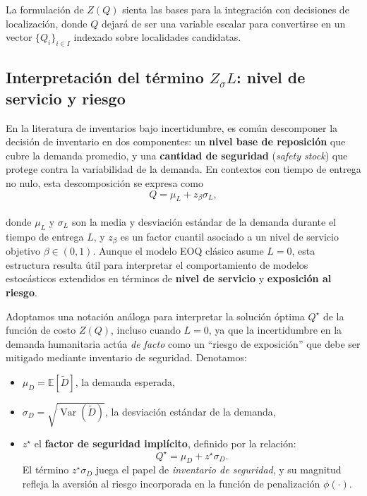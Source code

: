 \documentclass[
  spanish,
  us-letterpaper,
]{scrreprt}
\providecommand{\tightlist}{%
  \setlength{\itemsep}{0pt}\setlength{\parskip}{0pt}}
\numberwithin{equation}{section}
\begin{document}
La formulación de \(Z(Q)\) sienta las bases para la integración con
decisiones de localización, donde \(Q\) dejará de ser una variable
escalar para convertirse en un vector \(\{Q_i\}_{i \in I}\) indexado
sobre localidades candidatas.

\subsection{\texorpdfstring{Interpretación del término \(Z_{\sigma} L\):
nivel de servicio y
riesgo}{Interpretación del término Z\_\{\textbackslash sigma\} L: nivel de servicio y riesgo}}\label{interpretaciuxf3n-del-tuxe9rmino-z_sigma-l-nivel-de-servicio-y-riesgo}

En la literatura de inventarios bajo incertidumbre, es común descomponer
la decisión de inventario en dos componentes: un \textbf{nivel base de
reposición} que cubre la demanda promedio, y una \textbf{cantidad de
seguridad} (\emph{safety stock}) que protege contra la variabilidad de
la demanda. En contextos con tiempo de entrega no nulo, esta
descomposición se expresa como\\
\[
Q = \mu_L + z_\beta \sigma_L,
\]\\
donde \(\mu_L\) y \(\sigma_L\) son la media y desviación estándar de la
demanda durante el tiempo de entrega \(L\), y \(z_\beta\) es un factor
cuantil asociado a un nivel de servicio objetivo \(\beta \in (0,1)\).
Aunque el modelo EOQ clásico asume \(L = 0\), esta estructura resulta
útil para interpretar el comportamiento de modelos estocásticos
extendidos en términos de \textbf{nivel de servicio} y
\textbf{exposición al riesgo}.

Adoptamos una notación análoga para interpretar la solución óptima
\(Q^\star\) de la función de costo \(Z(Q)\), incluso cuando \(L = 0\),
ya que la incertidumbre en la demanda humanitaria actúa \emph{de facto}
como un ``riesgo de exposición'' que debe ser mitigado mediante
inventario de seguridad. Denotamos:

\begin{itemize}
\tightlist
\item
  \(\mu_D = \mathbb{E}[\tilde{D}]\), la demanda esperada,
\item
  \(\sigma_D = \sqrt{\operatorname{Var}(\tilde{D})}\), la desviación
  estándar de la demanda,
\item
  \(z^\star\) el \textbf{factor de seguridad implícito}, definido por la
  relación: \[
  Q^\star = \mu_D + z^\star \sigma_D.
  \] El término \(z^\star \sigma_D\) juega el papel de \emph{inventario
  de seguridad}, y su magnitud refleja la aversión al riesgo incorporada
  en la función de penalización \(\phi(\cdot)\).
\end{itemize}
\end{document}
